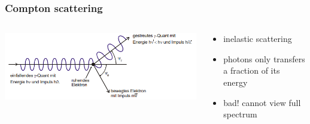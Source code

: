 \documentclass[aspectratio=1610, 9pt]{beamer}
\begin{document}
\begin{frame}\frametitle{Compton scattering}
  \begin{columns}
    \begin{column}[c]{0.48\textwidth}
      \includegraphics[width=\textwidth]{plots/compton.png}
    \end{column}
    \begin{column}[c]{0.48\textwidth}
      \begin{itemize}
        \item inelastic scattering
        \item photons only transfers a fraction of its energy
        \item bad! cannot view full spectrum
      \end{itemize}
    \end{column}
  \end{columns}
\end{frame}
\end{document}
